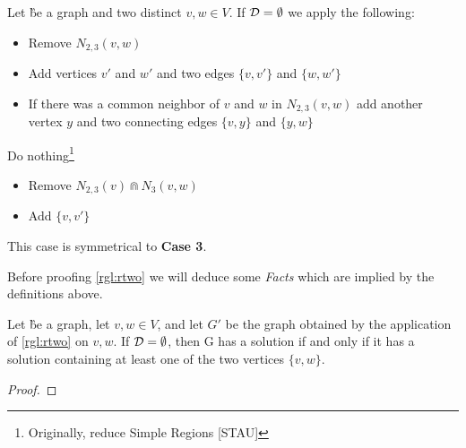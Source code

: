 \begin{rgl}\label{rgl:rtwo}
    Let \G be a graph and two distinct $v,w \in V$. If $\mathcal{D} = \emptyset$ we apply the following:
    \begin{caseof}

        \vspace{-5mm}
        \begin{itemize}
            \item Remove $N_{2,3}(v,w)$
            \item Add vertices $v'$ and $w'$ and two edges $\{v, v'\}$ and $\{w, w'\}$
            \item If there was a common neighbor of $v$ and $w$ in $N_{2,3}(v,w)$ add another vertex $y$ and two connecting edges  $\{v, y\}$ and $\{y, w\}$
        \end{itemize}
        Do nothing\footnote{Originally, reduce Simple Regions [STAU]}


        \vspace{-5mm}
        \begin{itemize}
            \item Remove $N_{2,3}(v) \Cap N_3(v,w)$
            \item Add $\{v, v'\}$ 
        \end{itemize}

         This case is symmetrical to \textbf{Case 3}. 
    \end{caseof}
\end{rgl}


Before proofing \cref*{rgl:rtwo} we will deduce some \textit{Facts} which are implied by the definitions above.

\begin{fact}
    Let \G be a graph, let $v,w \in V$, and let $G'$ be the graph obtained by the application of \cref*{rgl:rtwo} on $v,w$. If $\mathcal{D} = \emptyset$, then G has a solution if and only if it has a solution containing at least one of the two vertices $\{v,w \}$.
\end{fact}
\begin{proof}
    
\end{proof}

